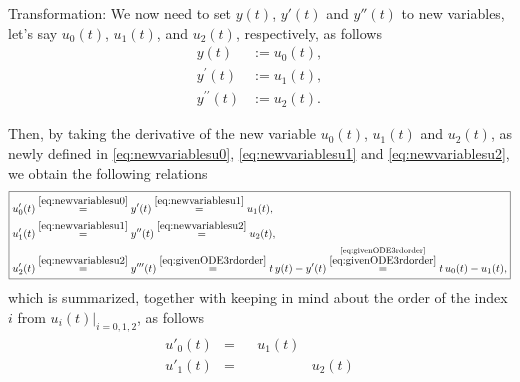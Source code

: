\documentclass[12pt]{article}
\begin{document}
\begin{enumerate}[i)]
	      Transformation: We now need to set
	      $y(t)$, $y'(t)$ and $y''(t)$
	      to new variables, 
	      let's say $u_0(t)$, $u_1(t)$, and $u_2(t)$,
	      respectively, 
	      as follows
	      \begin{align}
		      y(t)                & := u_0(t),  
		      \label{eq:newvariablesu0}          \\
		      y^{\prime}(t)       & := u_1(t),  
		      \label{eq:newvariablesu1}          \\
		      y^{\prime\prime}(t) & := u_2(t). 
		      \label{eq:newvariablesu2}
	      \end{align}
	      
	      Then, by taking the derivative of 
	      the new variable $u_0(t)$, $u_1(t)$ and $u_2(t)$,
	      as newly defined in
	      \eqref{eq:newvariablesu0},
	      \eqref{eq:newvariablesu1} and
	      \eqref{eq:newvariablesu2},
	      we obtain the following relations
	      \begin{align}
		      \boxed{
			      \begin{aligned}
				      u_0^{\prime}(t) 
				       & \stackrel{\eqref{eq:newvariablesu0}}{=}
				      y'(t)  
				      \stackrel{\eqref{eq:newvariablesu1}}{=}
				      u_1(t),                                    \\
				      u_1^{\prime}(t) 
				       & \stackrel{\eqref{eq:newvariablesu1}}{=}
				      y''(t)  
				      \stackrel{\eqref{eq:newvariablesu2}}{=}
				      u_2(t),                                    \\
				      u_2^{\prime}(t) 
				       & 
				      \stackrel{\eqref{eq:newvariablesu2}}{=}
				      y'''(t)
				      \stackrel{\eqref{eq:givenODE3rdorder}}{=}
				      t\,y(t)-y'(t)
				      \stackrel{
					      \stackrel
					      {\mbox{\scriptsize $\eqref{eq:givenODE3rdorder}$}}
					      {\eqref{eq:givenODE3rdorder}}
				      }{=}
				      t\,u_0(t)-u_1(t),
			      \end{aligned}
		      }
	      \end{align}
	      which is summarized, 
	      together with keeping in mind about 
	      the order of the index $i$ from 
	      $u_{i}(t)|_{i=0,1,2}$, 
	      as follows 
	      \begin{align}
		      \begin{array}{ccccc}
			      u'_{0}(t) & = &             & u_{1}(t)  &          \\
			      u'_{1}(t) & = &             &           & u_{2}(t) \\

\end{array}
\end{align}
\end{enumerate}
\end{document}
